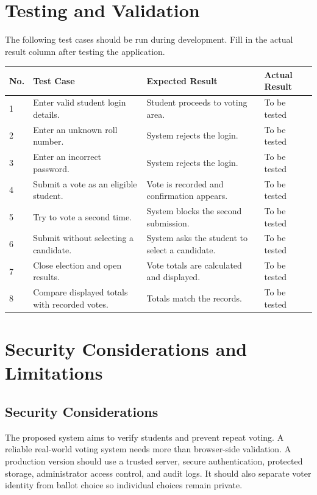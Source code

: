 \documentclass[12pt,a4paper]{report}
\begin{document}
\chapter{Testing and Validation}
The following test cases should be run during development. Fill in the actual result column after testing the application.
\begin{longtable}{p{0.7cm}p{4.3cm}p{5.3cm}p{2.4cm}}
\toprule
\textbf{No.}&\textbf{Test Case}&\textbf{Expected Result}&\textbf{Actual Result}\\\midrule
1&Enter valid student login details.&Student proceeds to voting area.&To be tested\\
2&Enter an unknown roll number.&System rejects the login.&To be tested\\
3&Enter an incorrect password.&System rejects the login.&To be tested\\
4&Submit a vote as an eligible student.&Vote is recorded and confirmation appears.&To be tested\\
5&Try to vote a second time.&System blocks the second submission.&To be tested\\
6&Submit without selecting a candidate.&System asks the student to select a candidate.&To be tested\\
7&Close election and open results.&Vote totals are calculated and displayed.&To be tested\\
8&Compare displayed totals with recorded votes.&Totals match the records.&To be tested\\
\bottomrule
\end{longtable}

\chapter{Security Considerations and Limitations}
\section{Security Considerations}
The proposed system aims to verify students and prevent repeat voting. A reliable real-world voting system needs more than browser-side validation. A production version should use a trusted server, secure authentication, protected storage, administrator access control, and audit logs. It should also separate voter identity from ballot choice so individual choices remain private.
\end{document}
